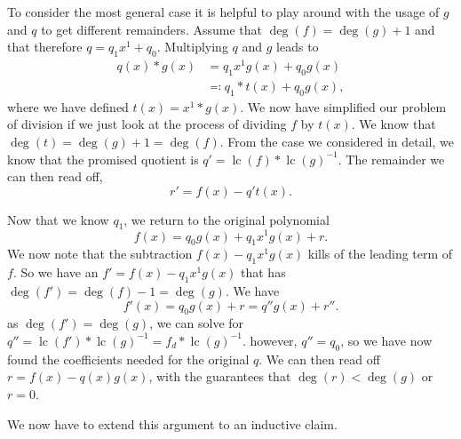 \documentclass{article}
\DeclareMathOperator{\lc}{lc}
\begin{document}
To consider the most general case it is helpful to play around with the usage of $g$ and $q$ to get different remainders. Assume that $\deg(f) = \deg(g) + 1$ and that therefore $q = q_1 x^1 + q_0$. Multiplying $q$ and $g$ leads to 
\begin{align}
    q(x) * g(x) &= q_1 x^1 g(x) + q_0 g(x) \\
    &\eqqcolon q_1 * t(x) + q_0 g(x),
\end{align}
where we have defined $t(x) = x^1 * g(x)$. We now have simplified our problem of division if we just look at the process of dividing $f$ by $t(x)$. We know that $\deg(t) = \deg(g) + 1 = \deg(f)$. From the case we considered in detail, we know that the promised quotient is $q' = \lc(f) * \lc(g)^{-1}$. The remainder we can then read off,
\begin{equation}
    r' = f(x) - q' t(x).
\end{equation} 

Now that we know $q_1$, we return to the original polynomial
\begin{equation}
    f(x) = q_0 g(x) + q_1 x^1 g(x) + r.
\end{equation}
We now note that the subtraction $f(x) - q_1 x^1 g(x)$ kills of the leading term of $f$. So we have an $f' = f(x) - q_1 x^1 g(x)$ that has $\deg(f') = \deg(f) - 1 = \deg(g)$. We have
\begin{equation}
    f'(x) = q_0 g(x) + r = q'' g(x) + r''.
\end{equation}
as $\deg(f') = \deg(g)$, we can solve for $q'' = \lc(f') * \lc(g)^{-1} = f_{d} * \lc(g)^{-1}$. however, $q'' = q_0$, so we have now found the coefficients needed for the original $q$. We can then read off $r = f(x) - q(x) g(x)$, with the guarantees that $\deg(r) < \deg(g)$ or $r = 0$. 

We now have to extend this argument to an inductive claim.
\end{document}
